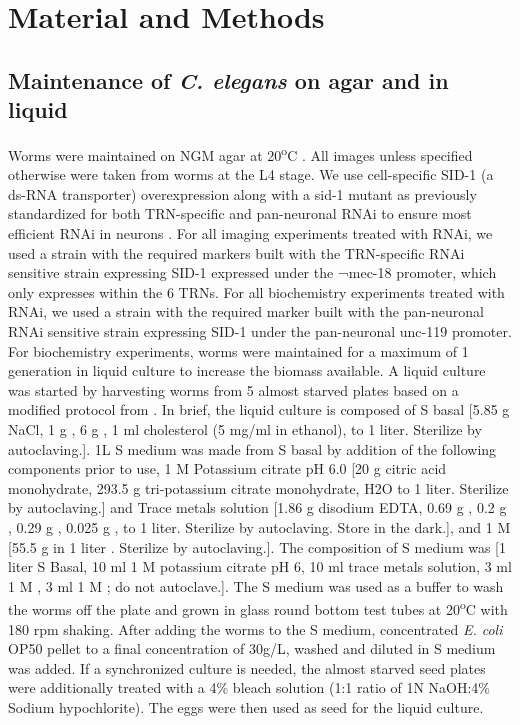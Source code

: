 	
\chapter{Material and Methods}

\section{Maintenance of \textit{C. elegans} on agar and in liquid}

Worms were maintained on NGM agar at 20\textsuperscript{o}C \parencite{brenner1974}. All images unless specified otherwise were taken from worms at the L4 stage. We use cell-specific SID-1 (a ds-RNA transporter) overexpression along with a sid-1 mutant as previously standardized for both TRN-specific and pan-neuronal RNAi to ensure most efficient RNAi in neurons \parencite{calixto2010}. For all imaging experiments treated with RNAi, we used a strain with the required markers built with the TRN-specific RNAi sensitive strain expressing SID-1 expressed under the ¬mec-18 promoter, which only expresses within the 6 TRNs. For all biochemistry experiments treated with RNAi, we used a strain with the required marker built with the pan-neuronal RNAi sensitive strain expressing SID-1 under the pan-neuronal unc-119 promoter. For biochemistry experiments, worms were maintained for a maximum of 1 generation in liquid culture to increase the biomass available. A liquid culture was started by harvesting worms from 5 almost starved plates based on a modified protocol from \parencite{shaham2006}. In brief, the liquid culture is composed of S basal [5.85 g NaCl, 1 g , 6 g , 1 ml cholesterol (5 mg/ml in ethanol),  to 1 liter. Sterilize by autoclaving.]. 1L S medium was made from S basal by addition of the following components prior to use, 1 M Potassium citrate pH 6.0 [20 g citric acid monohydrate, 293.5 g tri-potassium citrate monohydrate, H2O to 1 liter. Sterilize by autoclaving.] and Trace metals solution [1.86 g disodium EDTA, 0.69 g , 0.2 g , 0.29 g , 0.025 g ,  to 1 liter. Sterilize by autoclaving. Store in the dark.], and 1 M  [55.5 g  in 1 liter . Sterilize by autoclaving.]. The composition of S medium was [1 liter S Basal, 10 ml 1 M potassium citrate pH 6, 10 ml trace metals solution, 3 ml 1 M , 3 ml 1 M ; do not autoclave.]. The S medium was used as a buffer to wash the worms off the plate and grown in glass round bottom test tubes at 20\textsuperscript{o}C with 180 rpm shaking. After adding the worms to the S medium, concentrated \textit{E. coli} OP50 pellet to a final concentration of 30g/L, washed and diluted in S medium was added. If a synchronized culture is needed, the almost starved seed plates were additionally treated with a 4\% bleach solution (1:1 ratio of 1N NaOH:4\% Sodium hypochlorite). The eggs were then used as seed for the liquid culture.

